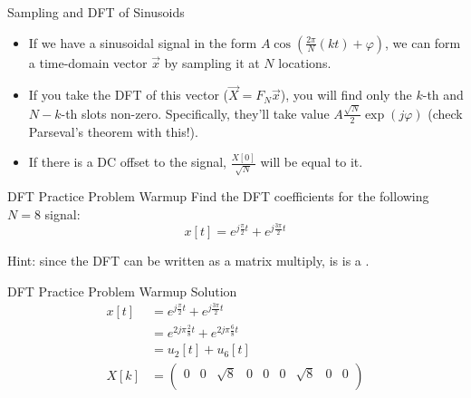 \begin{frame}{Sampling and DFT of Sinusoids}
  \begin{itemize}
    \item If we have a sinusoidal signal in the form $A \cos(\frac{2\pi}{N}(kt) + \varphi)$, we can form a time-domain vector $\vec{x}$ by sampling it
      at $N$ locations.
    \item If you take the DFT of this vector ($\vec{X} = F_N \vec{x}$), you will find only the $k$-th and $N-k$-th slots non-zero.
      Specifically, they'll take value $A \frac{\sqrt{N}}{2}\exp(j \varphi)$ (check Parseval's theorem with this!).
    \item If there is a DC offset to the signal, $\frac{X[0]}{\sqrt{N}}$ will be equal to it.
  \end{itemize}
\end{frame}

\begin{frame}{DFT Practice Problem Warmup}
  Find the DFT coefficients for the following $N=8$ signal:
  \begin{equation*}
    x[t] = e^{j\frac{\pi}{2}t} + e^{j\frac{3\pi}{2}t}
  \end{equation*}

  \pause Hint: since the DFT can be written as a matrix multiply, is is a .

\end{frame}

\begin{frame}{DFT Practice Problem Warmup Solution}
  \begin{align*}
    x[t] &=  e^{j\frac{\pi}{2}t} + e^{j\frac{3\pi}{2}t} \\
    &= e^{2j\pi\frac{2}{8}t} + e^{2j\pi\frac{6}{8}t} \\
    &= u_2[t] + u_6[t] \\
    X[k] &= \begin{pmatrix} 0 & 0 & \sqrt{8} & 0 & 0 & 0 & \sqrt{8} & 0 & 0 \\ \end{pmatrix}
  \end{align*}
\end{frame}

